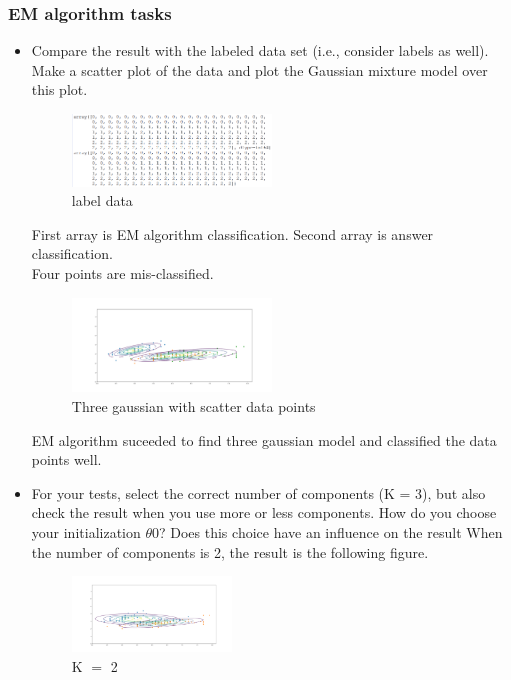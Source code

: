 \documentclass[a4paper]{article}
\begin{document}
	\subsubsection{EM algorithm tasks}
	\begin{itemize}
		\item Compare the result with the labeled data set (i.e., consider labels as well). Make a scatter plot of the data and plot the Gaussian mixture model over this plot.
		
		\begin{figure}[h]
			\begin{center}
				\includegraphics[width=0.5\textwidth]{4_number_diff.png}
				\caption{label data}
			\end{center}
		\end{figure}
		First array is EM algorithm classification. Second array is answer classification.\\
		Four points are mis-classified.
		
		\begin{figure}[h]
			\begin{center}
				\includegraphics[width=0.5\textwidth]{4_gauss.png}
				\caption{Three gaussian with scatter data points}
			\end{center}
		\end{figure}
		
		EM algorithm suceeded to find three gaussian model and classified the data points well.
		
		\item For your tests, select the correct number of components (K = 3), but also check the result when you use more or less components. How do you choose your initialization $\theta$0? Does this choice have an inﬂuence on the result
		When the number of components is 2, the result is the following figure.
		
		\begin{figure}[h]
			\begin{center}
				\includegraphics[width=0.4\textwidth]{4_K2.png}
				\caption{K $=$ 2}
			\end{center}
		\end{figure}
		

\end{itemize}
\end{document}
